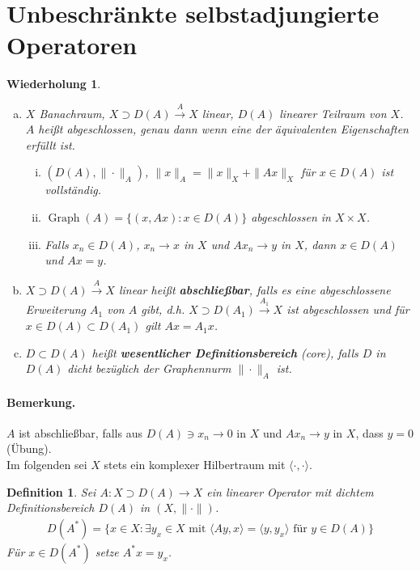 \documentclass[12pt]{extreport} %
\newtheorem{Definition}[Satz]{Definition}
\newtheorem{Wiederholung}[Satz]{Wiederholung}
\DeclareMathOperator{\Graph}{Graph}
\numberwithin{equation}{section}
\newcommand{\m}{\cdot}
\begin{document}
\section{Unbeschränkte selbstadjungierte Operatoren}

\begin{Wiederholung}
	~
	\begin{enumerate}[a)]
		\item $X$ Banachraum, $X\supset D(A) \overset{A}{\rightarrow} X$ linear, $D(A)$ linearer Teilraum von $X$. $A$ heißt abgeschlossen, genau dann wenn eine der äquivalenten Eigenschaften erfüllt ist.
		\begin{enumerate}[(i)]
			\item $(D(A),\|\m\|_A)$, $\|x\|_A = \|x\|_X + \|Ax\|_X$ für $x\in D(A)$ ist vollständig.
			\item $\Graph(A) = \{(x,Ax): x\in D(A) \}$ abgeschlossen in $X\times X$.
			\item Falls $x_n\in D(A)$, $x_n\rightarrow x$ in $X$ und $Ax_n\rightarrow y$ in $X$, dann $x\in D(A)$ und $Ax = y$.
		\end{enumerate}
		\item $X\supset D(A)\overset{A}{\rightarrow} X$ linear heißt \textbf{abschließbar}, falls es eine abgeschlossene Erweiterung $A_1$ von $A$ gibt, d.h. $X\supset D(A_1)\overset{A_1}{\rightarrow}X$ ist abgeschlossen und für $x\in D(A)\subset D(A_1)$ gilt $Ax = A_1x$.
		\item $D\subset D(A)$ heißt \textbf{wesentlicher Definitionsbereich} (core), falls $D$ in $D(A)$ dicht bezüglich der Graphennurm $\|\m\|_A$ ist.
	\end{enumerate}
\end{Wiederholung}

\paragraph{Bemerkung.} $A$ ist abschließbar, falls aus $D(A)\ni x_n\rightarrow 0$ in $X$ und $Ax_n\rightarrow y$ in $X$, dass $y = 0$ (Übung).\\

Im folgenden sei $X$ stets ein komplexer Hilbertraum mit $\langle \m,\m\rangle$.

\begin{Definition}
	Sei $A\colon X\supset D(A)\rightarrow X$ ein linearer Operator mit dichtem Definitionsbereich $D(A)$ in $(X,\|\m\|)$.
	\begin{align*}
		D(A^*) = \{x\in X\colon \exists y_x\in X \text{ mit } \langle Ay, x\rangle = \langle y,y_x\rangle\text{ für } y\in D(A) \}
	\end{align*}
	Für $x\in D(A^*)$ setze $A^*x = y_x$.
\end{Definition}
\end{document}
